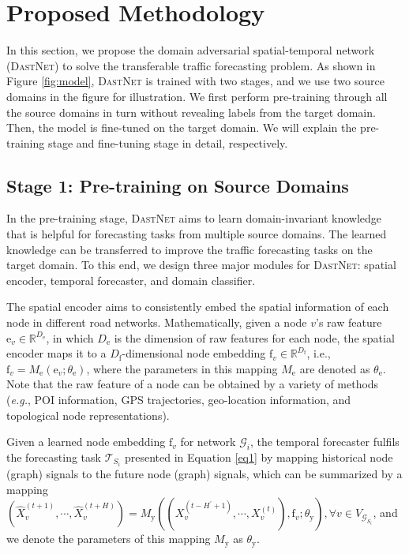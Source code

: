 \documentclass[sigconf]{acmart}
\theoremstyle{definition}
\begin{document}
\section{Proposed Methodology}\label{sec:method}
In this section, we propose the domain adversarial spatial-temporal network (\textsc{DastNet}) to solve the transferable traffic forecasting problem. As shown in Figure \ref{fig:model}, \textsc{DastNet} is trained with two stages, and we use two source domains in the figure for illustration. We first perform pre-training through all the source domains in turn without revealing labels from the target domain. Then, the model is fine-tuned on the target domain. We will explain the pre-training stage and fine-tuning stage in detail, respectively.



\subsection{Stage 1: Pre-training on Source Domains}
In the pre-training stage, \textsc{DastNet} aims to learn domain-invariant knowledge that is helpful for forecasting tasks from multiple source domains. The learned knowledge can be transferred to improve the traffic forecasting tasks on the target domain. To this end, we design three major modules for \textsc{DastNet}: spatial encoder, temporal forecaster, and domain classifier.



The spatial encoder aims to consistently embed the spatial information of each node in different road networks. Mathematically, given a node $v$'s raw feature $\mathrm{e}_v \in \mathbb{R}^{D_{\mathrm{e}}}$, in which $D_\mathrm{e}$ is the dimension of raw features for each node, the spatial encoder maps it to a $D_{\mathrm{f}}$-dimensional node embedding $\mathrm{f}_v \in \mathbb{R}^{D_{\mathrm{f}}}$, i.e., $\mathrm{f}_v={M}_\mathrm{e}\left(\mathrm{e}_v; \theta_\mathrm{e}\right)$, where the parameters in this mapping $M_\mathrm{e}$ are denoted as $\theta_\mathrm{e}$. Note that the raw feature of a node can be obtained by a variety of methods ({\em e.g.}, POI information, GPS trajectories, geo-location information, and topological node representations).

Given a learned node embedding $\mathrm{f}_v$ for network $\mathcal{G}_i$, the temporal forecaster fulfils the forecasting task $\mathcal{T}_{S_i}$ presented in Equation \ref{eq1} by mapping historical node (graph) signals to the future node (graph) signals, which can be summarized by a mapping $(\widehat{X}_{v}^{(t+1)},\cdots,\widehat{X}_{v}^{(t+H)})=M_\mathrm{y}\left((X_{v}^{(t-H^{\prime}+1)},\cdots,X_{v}^{(t)}),\mathrm{f}_v;\theta_{\mathrm{y}}\right), \forall v \in V_{\mathcal{G}_{S_i}}$, and we denote the parameters of this mapping $M_\mathrm{y}$ as $\theta_\mathrm{y}$. 
\end{document}
